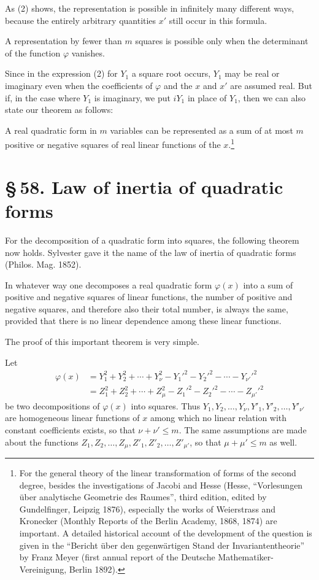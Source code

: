 \documentclass[11pt]{article}
\providecommand{\sect}[2]{\section*{\S\,#1. #2}}
\begin{document}
As (2) shows, the representation is possible in infinitely many different ways, because the entirely arbitrary quantities $x'$ still occur in this formula.

A representation by fewer than $m$ squares is possible only when the determinant of the function $\varphi$ vanishes.

Since in the expression (2) for $Y_1$ a square root occurs, $Y_1$ may be real or imaginary even when the coefficients of $\varphi$ and the $x$ and $x'$ are assumed real. But if, in the case where $Y_1$ is imaginary, we put $iY_1$ in place of $Y_1$, then we can also state our theorem as follows:

A real quadratic form in $m$ variables can be represented as a sum of at most $m$ positive or negative squares of real linear functions of the $x$.\footnote{For the general theory of the linear transformation of forms of the second degree, besides the investigations of Jacobi and Hesse (Hesse, ``Vorlesungen über analytische Geometrie des Raumes'', third edition, edited by Gundelfinger, Leipzig 1876), especially the works of Weierstrass and Kronecker (Monthly Reports of the Berlin Academy, 1868, 1874) are important. A detailed historical account of the development of the question is given in the ``Bericht über den gegenwärtigen Stand der Invariantentheorie'' by Franz Meyer (first annual report of the Deutsche Mathematiker-Vereinigung, Berlin 1892).}

\sect{58}{Law of inertia of quadratic forms}

For the decomposition of a quadratic form into squares, the following theorem now holds. Sylvester gave it the name of the law of inertia of quadratic forms (Philos. Mag. 1852).

In whatever way one decomposes a real quadratic form $\varphi(x)$ into a sum of positive and negative squares of linear functions, the number of positive and negative squares, and therefore also their total number, is always the same, provided that there is no linear dependence among these linear functions.

The proof of this important theorem is very simple.

Let
\begin{equation}
\begin{aligned}
 \varphi(x)&=Y_1^2+Y_2^2+\cdots+Y_\nu^2-Y_1'^2-Y_2'^2-\cdots-Y_{\nu'}'^2\\
 &=Z_1^2+Z_2^2+\cdots+Z_\mu^2-Z_1'^2-Z_2'^2-\cdots-Z_{\mu'}'^2
\end{aligned}
\tag{1}
\end{equation}
be two decompositions of $\varphi(x)$ into squares. Thus $Y_1,Y_2,\ldots,Y_\nu,Y'_1,Y'_2,\ldots,Y'_{\nu'}$ are homogeneous linear functions of $x$ among which no linear relation with constant coefficients exists, so that $\nu+\nu'\leq m$. The same assumptions are made about the functions $Z_1,Z_2,\ldots,Z_\mu,Z'_1,Z'_2,\ldots,Z'_{\mu'}$, so that $\mu+\mu'\leq m$ as well.
\end{document}
